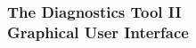 \documentclass[9pt]{beamer}
\begin{document}
{



\begin{frame}[fragile]
  \frametitle{{ }\\The Diagnostics Tool II\\Graphical User Interface}

\vspace{3cm}


\end{frame}}
\end{document}
